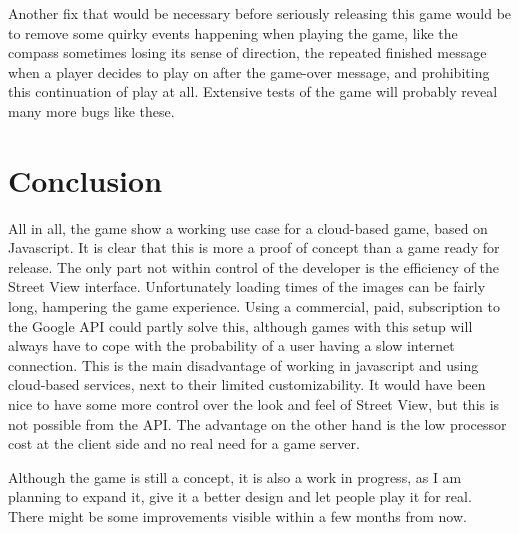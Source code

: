 \documentclass[a4paper,10pt]{article}
\begin{document}
Another fix that would be necessary before seriously releasing this game would be to remove some quirky events happening when playing the game, like the compass sometimes losing its sense of direction, the repeated finished message when a player decides to play on after the game-over message, and prohibiting this continuation of play at all. Extensive tests of the game will probably reveal many more bugs like these.


\section{Conclusion} %
\label{sub:conclusion}
All in all, the game show a working use case for a cloud-based game, based on Javascript. It is clear that this is more a proof of concept than a game ready for release. The only part not within control of the developer is the efficiency of the Street View interface. Unfortunately loading times of the images can be fairly long, hampering the game experience. Using a commercial, paid, subscription to the Google API could partly solve this, although games with this setup will always have to cope with the probability of a user having a slow internet connection. This is the main disadvantage of working in javascript and using cloud-based services, next to their limited customizability. It would have been nice to have some more control over the look and feel of Street View, but this is not possible from the API. The advantage on the other hand is the low processor cost at the client side and no real need for a game server.

Although the game is still a concept, it is also a work in progress, as I am planning to expand it, give it a better design and let people play it for real. There might be some improvements visible within a few months from now.



\end{document}
